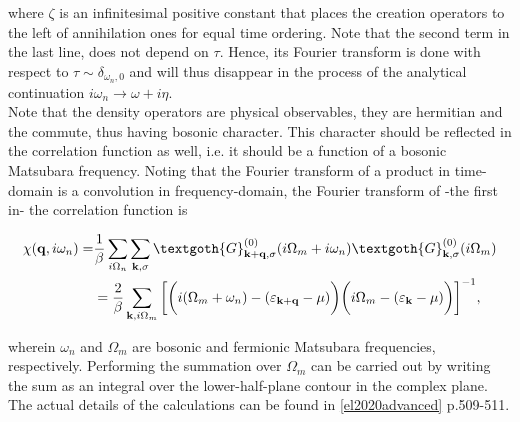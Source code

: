 where $\zeta$ is an infinitesimal positive constant that places the creation operators to the left of annihilation ones for equal time ordering. Note that the second term in the last line, does not depend on $\tau$. Hence, its Fourier transform is done with respect to $\tau \sim \delta_{\omega_n, 0}$ and will thus disappear in the process of the analytical continuation $i \omega_n \rightarrow \omega + i\eta$. \\

Note that the density operators are physical observables, they are hermitian and the commute, thus having bosonic character. This character should be reflected in the correlation function as well, i.e. it should be a function of a bosonic Matsubara frequency. Noting that the Fourier transform of a product in time-domain is a convolution in frequency-domain, the Fourier transform of -the first in- the correlation function is 

\begin{equation}
    \begin{split}
        \chi({\bf q}, i \omega_n) =& \frac{1}{\beta} \sum_{i\Omega_n} \sum_{\substack{
        {\bf k},\sigma 
        }} \textgoth{G}_{{\bf k+q}, \sigma}^{(0)}(i\Omega_m + i\omega_n)\textgoth{G}_{{\bf k}, \sigma}^{(0)}(i\Omega_m) \\
        &= \frac{2}{\beta} \sum_{{\bf k}, i \Omega_m} \bigg[
        \bigg(i(\Omega_m + \omega_n) - (\varepsilon_{{\bf k+q}} - \mu)\bigg)
        \bigg(i\Omega_m - (\varepsilon_{{\bf k}} - \mu)\bigg)
        \bigg]^{-1},
    \end{split}
\end{equation}

wherein $\omega_n$ and $\Omega_m$ are bosonic and fermionic Matsubara frequencies, respectively. Performing the summation over $\Omega_m$ can be carried out by writing the sum as an integral over the lower-half-plane contour in the complex plane. The actual details of the calculations can be found in \ref{el2020advanced} p.509-511. 
